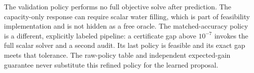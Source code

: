 The validation policy performs no full objective solve after prediction. The capacity-only response can require scalar water filling, which is part of feasibility implementation and is not hidden as a free oracle. The matched-accuracy policy is a different, explicitly labeled pipeline: a certificate gap above $10^{-7}$ invokes the full scalar solver and a second audit. Its last policy is feasible and its exact gap meets that tolerance. The raw-policy table and independent expected-gain guarantee never substitute this refined policy for the learned proposal.
